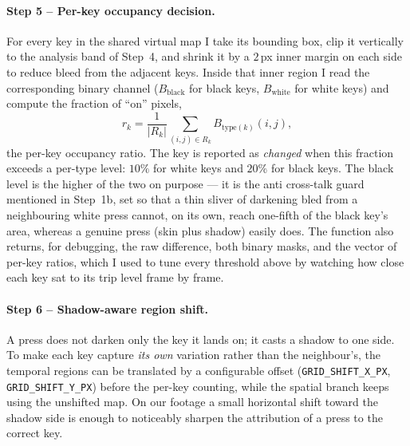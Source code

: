 \documentclass[11pt]{article}
\begin{document}
\paragraph{Step 5 -- Per-key occupancy decision.}
For every key in the shared virtual map I take its bounding box, clip it
vertically to the analysis band of Step~4, and shrink it by a $2$\,px inner margin
on each side to reduce bleed from the adjacent keys. Inside that inner region I
read the corresponding binary channel ($B_{\text{black}}$ for black keys,
$B_{\text{white}}$ for white keys) and compute the fraction of ``on'' pixels,
\begin{equation}
  r_k = \frac{1}{\lvert R_k \rvert}\sum_{(i,j)\in R_k} B_{\text{type}(k)}(i,j),
\end{equation}
the per-key occupancy ratio. The key is reported as \emph{changed} when this
fraction exceeds a per-type level: $10\%$ for white keys and $20\%$ for black
keys. The black level is the higher of the two on purpose --- it is the anti
cross-talk guard mentioned in Step~1b, set so that a thin sliver of darkening bled
from a neighbouring white press cannot, on its own, reach one-fifth of the black
key's area, whereas a genuine press (skin plus shadow) easily does. The function
also returns, for debugging, the raw difference, both binary masks, and the vector
of per-key ratios, which I used to tune every threshold above by watching how
close each key sat to its trip level frame by frame.

\paragraph{Step 6 -- Shadow-aware region shift.}
A press does not darken only the key it lands on; it casts a shadow to one side. To
make each key capture \emph{its own} variation rather than the neighbour's, the
temporal regions can be translated by a configurable offset
(\texttt{GRID\_SHIFT\_X\_PX}, \texttt{GRID\_SHIFT\_Y\_PX}) before the per-key
counting, while the spatial branch keeps using the unshifted map. On our footage a
small horizontal shift toward the shadow side is enough to noticeably sharpen the
attribution of a press to the correct key.
\end{document}
